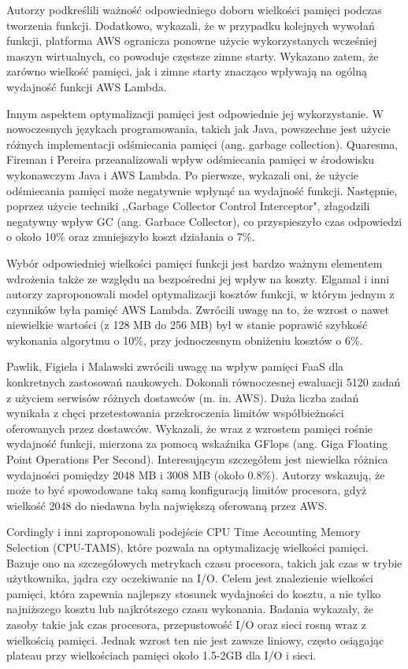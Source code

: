 Autorzy podkreślili ważność odpowiedniego doboru wielkości pamięci podczas tworzenia funkcji. 
Dodatkowo, wykazali, że w przypadku kolejnych wywołań funkcji, platforma AWS ogranicza ponowne użycie wykorzystanych wcześniej maszyn wirtualnych, co powoduje częstsze zimne starty.
Wykazano zatem, że zarówno wielkość pamięci, jak i zimne starty znacząco wpływają na ogólną wydajność funkcji AWS Lambda.

Innym aspektem optymalizacji pamięci jest odpowiednie jej wykorzystanie. 
W nowoczesnych językach programowania, takich jak Java, powszechne jest użycie różnych implementacji odśmiecania pamięci (ang. garbage collection). 
Quaresma, Fireman i Pereira \cite{9235063} przeanalizowali wpływ odśmiecania pamięci w środowisku wykonawczym Java i AWS Lambda. 
Po pierwsze, wykazali oni, że użycie odśmiecania pamięci może negatywnie wpłynąć na wydajność funkcji. 
Następnie, poprzez użycie techniki  ,,Garbage Collector Control Interceptor", złagodzili negatywny wpływ GC (ang. Garbace Collector), co przyspieszyło czas odpowiedzi o około 10\% oraz zmniejszyło koszt działania o 7\%. 

Wybór odpowiedniej wielkości pamięci funkcji jest bardzo ważnym elementem wdrożenia także ze względu na bezpośredni jej wpływ na koszty. Elgamal i inni autorzy \cite{8567674} zaproponowali model optymalizacji kosztów funkcji, w którym jednym z czynników była pamięć AWS Lambda. 
Zwrócili uwagę na to, że wzrost o nawet niewielkie wartości (z 128 MB do 256 MB) był w stanie poprawić szybkość wykonania algorytmu o 10\%, przy jednoczesnym obniżeniu kosztów o 6\%.

Pawlik, Figiela i Malawski \cite{pawlik2019performanceconsiderationsexecutionlarge} zwrócili uwagę na wpływ pamięci FaaS dla konkretnych zastosowań naukowych. 
Dokonali równoczesnej ewaluacji 5120 zadań z użyciem serwisów różnych dostawców (m. in. AWS). 
Duża liczba zadań wynikała z chęci przetestowania przekroczenia limitów współbieżności oferowanych przez dostawców. 
Wykazali, że wraz z wzrostem pamięci rośnie wydajność funkcji, mierzona za pomocą wskaźnika GFlops (ang. Giga Floating Point Operations Per Second). 
Interesującym szczegółem jest niewielka różnica wydajności pomiędzy 2048 MB i 3008 MB (około 0.8\%). 
Autorzy wskazują, że może to być spowodowane taką samą konfiguracją limitów procesora, gdyż wielkość 2048 do niedawna była największą oferowaną przez AWS.

Cordingly i inni \cite{9946331} zaproponowali podejście CPU Time Accounting Memory Selection (CPU-TAMS), które pozwala na optymalizację wielkości pamięci.
Bazuje ono na szczegółowych metrykach czasu procesora, takich jak czas w trybie użytkownika, jądra czy oczekiwanie na I/O.
Celem jest znalezienie wielkości pamięci, która zapewnia najlepszy stosunek wydajności do kosztu, a nie tylko najniższego kosztu lub najkrótszego czasu wykonania.
Badania wykazały, że zasoby takie jak czas procesora, przepustowość I/O oraz sieci rosną wraz z wielkością pamięci.
Jednak wzrost ten nie jest zawsze liniowy, często osiągając plateau przy wielkościach pamięci około 1.5-2GB dla I/O i sieci. 

